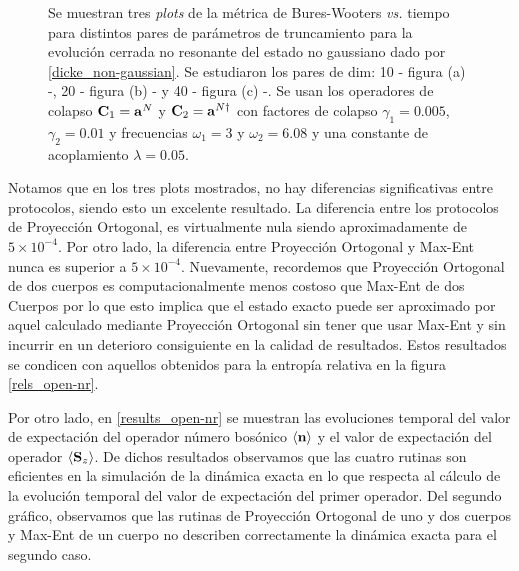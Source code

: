 \documentclass{report} %
\numberwithin{equation}{section}
\begin{document}
\begin{figure}
\caption{Se muestran tres \textit{plots} de la métrica de Bures-Wooters \textit{vs.} tiempo para distintos pares de parámetros de truncamiento para la evolución cerrada no resonante del estado no gaussiano dado por \eqref{dicke_non-gaussian}. Se estudiaron los pares de dim: 10 - figura (a) -, 20 - figura (b) - y 40 - figura (c) -. Se usan los operadores de colapso ${\bf C}_1 = {\bf a}^{N}$ y ${\bf C}_2 = {\bf a}^{N\dagger}$ con factores de colapso $\gamma_1 = 0.005$, $\gamma_2 = 0.01$ y frecuencias $\omega_1 = 3$ y $\omega_2 = 6.08$ y una constante de acoplamiento $\lambda = 0.05$.}
\label{dicke_ng}
\end{figure}

Notamos que en los tres plots mostrados, no hay diferencias significativas entre protocolos, siendo esto un excelente resultado. La diferencia entre los protocolos de Proyección Ortogonal, es virtualmente nula siendo aproximadamente de $5\times 10^{-4}$. Por otro lado, la diferencia entre Proyección Ortogonal y Max-Ent nunca es superior a $5\times 10^{-4}$. Nuevamente, recordemos que Proyección Ortogonal de dos cuerpos es computacionalmente menos costoso que Max-Ent de dos Cuerpos por lo que esto implica que el estado exacto puede ser aproximado por aquel calculado mediante Proyección Ortogonal sin tener que usar Max-Ent y sin incurrir en un deterioro consiguiente en la calidad de resultados. Estos resultados se condicen con aquellos obtenidos para la entropía relativa en la figura \ref{rels_open-nr}. 

Por otro lado, en \ref{results_open-nr} se muestran las evoluciones temporal del valor de expectación del operador número bosónico $\langle {\bf n} \rangle $ y el valor de expectación del operador $\langle {\bf S}_z \rangle$. De dichos resultados observamos que las cuatro rutinas son eficientes en la simulación de la dinámica exacta en lo que respecta al cálculo de la evolución temporal del valor de expectación del primer operador. 
Del segundo gráfico, observamos que las rutinas de Proyección Ortogonal de uno y dos cuerpos y  Max-Ent de un cuerpo no describen correctamente la dinámica exacta para el segundo caso.\\
\end{document}
